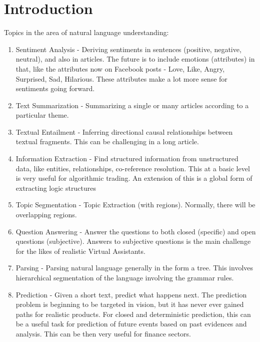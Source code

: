 \documentclass{book}
\begin{document}
\section{Introduction}
Topics in the area of natural language understanding:
\begin{enumerate}
\item Sentiment Analysis - Deriving sentiments in sentences (positive, negative, neutral), and also in articles. The future is to include emotions (attributes) in that, like the attributes now on Facebook posts - Love, Like, Angry, Surprised, Sad, Hilarious. These attributes make a lot more sense for sentiments going forward.

\item Text Summarization - Summarizing a single or many articles according to a particular theme.

\item Textual Entailment - Inferring directional causal relationships between textual fragments. This can be challenging in a long article.

\item Information Extraction - Find structured information from unstructured data, like entities, relationships, co-reference resolution. This at a basic level is very useful for algorithmic trading. An extension of this is a global form of extracting logic structures

\item Topic Segmentation - Topic Extraction (with regions). Normally, there will be overlapping regions.

\item Question Answering - Answer the questions to both closed (specific) and open questions (subjective). Answers to subjective questions is the main challenge for the likes of realistic Virtual Assistants.

\item Parsing - Parsing natural language generally in the form a tree. This involves hierarchical segmentation of the language involving the grammar rules.

\item Prediction - Given a short text, predict what happens next. The prediction problem is beginning to be targeted in vision, but it has never ever gained paths for realistic products. For closed and deterministic prediction, this can be a useful task for prediction of future events based on past evidences and analysis. This can be then very useful for finance sectors.


\end{enumerate}
\end{document}
